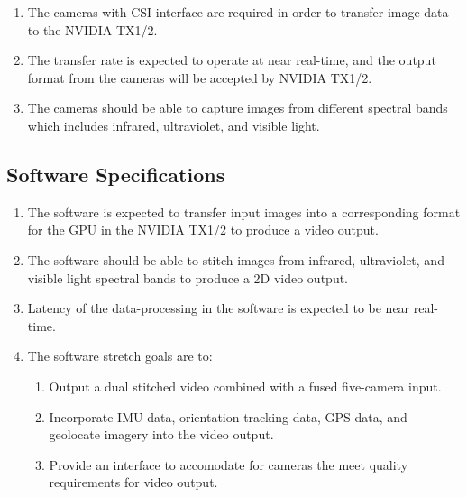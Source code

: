 \documentclass[letterpaper,10pt,serif,draftclsnofoot,onecolumn,compsoc,titlepage]{IEEEtran}
\begin{document}
\begin{enumerate}[label=\alph*]
	\item The cameras with CSI interface are required in order to transfer image data to 
	the NVIDIA TX1/2.\\
	\item The transfer rate is expected to operate at near real-time, and the output format 
	from the cameras will be accepted by NVIDIA TX1/2.\\
	\item The cameras should be able to capture images from different spectral bands 
	which includes infrared, ultraviolet, and visible light.\\
\end{enumerate}

\subsection{Software Specifications}

\begin{enumerate}[label=\alph*]
	\item The software is expected to transfer input images into a corresponding format for 
	the GPU in the NVIDIA TX1/2 to produce a video output.\\
	\item The software should be able to stitch images from infrared, ultraviolet, 
	and visible light spectral bands to produce a 2D video output. \\
	\item Latency of the data-processing in the software is expected to be near 
	real-time. \\
	\item The software stretch goals are to:
	\begin{enumerate}
	 	\item Output a dual stitched video combined with a fused five-camera input.\\
		\item Incorporate IMU data, orientation tracking data, GPS data, and geolocate 
		imagery into the video output.\\
		\item Provide an interface to accomodate for cameras the meet quality
		requirements for video output. \\
	\end{enumerate} 
\end{enumerate}
\end{document}
